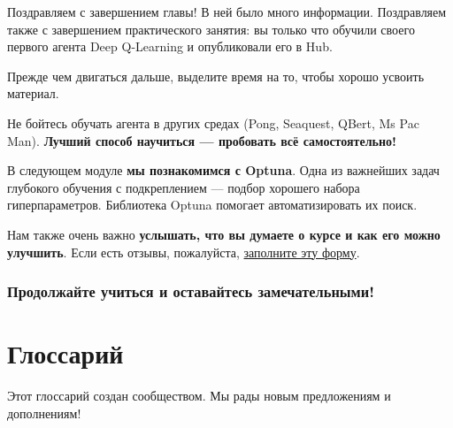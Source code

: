 \documentclass[11pt,a4paper]{article}
\begin{document}
Поздравляем с завершением главы! В ней было много информации. Поздравляем также с завершением практического занятия: вы только что обучили своего первого агента Deep Q-Learning и опубликовали его в Hub.

Прежде чем двигаться дальше, выделите время на то, чтобы хорошо усвоить материал.

Не бойтесь обучать агента в других средах (Pong, Seaquest, QBert, Ms Pac Man). \textbf{Лучший способ научиться --- пробовать всё самостоятельно!}


В следующем модуле \textbf{мы познакомимся с Optuna}. Одна из важнейших задач глубокого обучения с подкреплением --- подбор хорошего набора гиперпараметров. Библиотека Optuna помогает автоматизировать их поиск.

Нам также очень важно \textbf{услышать, что вы думаете о курсе и как его можно улучшить}. Если есть отзывы, пожалуйста, \href{https://forms.gle/BzKXWzLAGZESGNaE9}{заполните эту форму}.

\subsubsection{Продолжайте учиться и оставайтесь замечательными!}\label{keep-learning-stay-awesome-1}

\section{Глоссарий}\label{glossary}

Этот глоссарий создан сообществом. Мы рады новым предложениям и дополнениям!
\end{document}

